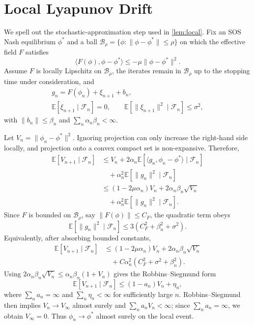 \documentclass{article}
\theoremstyle{plain}
\theoremstyle{definition}
\theoremstyle{remark}
\newcommand{\E}{\mathbb{E}}
\newcommand{\B}{\mathcal{B}}
\newcommand{\F}{\mathcal{F}}
\begin{document}
\section{Local Lyapunov Drift}\label{app:lyapunov}

We spell out the stochastic-approximation step used in \cref{lem:local}. Fix an SOS Nash equilibrium $\phi^\ast$ and a ball $\B_\rho=\{\phi:\|\phi-\phi^\ast\|\le\rho\}$ on which the effective field $F$ satisfies
\[
\langle F(\phi),\phi-\phi^\ast\rangle\le -\mu\|\phi-\phi^\ast\|^2 .
\]
Assume $F$ is locally Lipschitz on $\B_\rho$, the iterates remain in $\B_\rho$ up to the stopping time under consideration, and
\[
\begin{gathered}
g_n=F(\phi_n)+\xi_{n+1}+b_n,\\
\E[\xi_{n+1}\mid\F_n]=0,\qquad
\E[\|\xi_{n+1}\|^2\mid\F_n]\le\sigma^2,
\end{gathered}
\]
with $\|b_n\|\le\beta_n$ and $\sum_n\alpha_n\beta_n<\infty$.

Let $V_n=\|\phi_n-\phi^\ast\|^2$. Ignoring projection can only increase the right-hand side locally, and projection onto a convex compact set is non-expansive. Therefore,
\[
\begin{aligned}
\E[V_{n+1}\mid\F_n]
&\le V_n
   +2\alpha_n\E[\langle g_n,\phi_n-\phi^\ast\rangle\mid\F_n]\\
&\quad+\alpha_n^2\E[\|g_n\|^2\mid\F_n]\\
&\le (1-2\mu\alpha_n)V_n
   +2\alpha_n\beta_n\sqrt{V_n}\\
&\quad+\alpha_n^2\E[\|g_n\|^2\mid\F_n].
\end{aligned}
\]
Since $F$ is bounded on $\B_\rho$, say $\|F(\phi)\|\le C_F$, the quadratic term obeys
\[
\E[\|g_n\|^2\mid\F_n]\le
3(C_F^2+\beta_n^2+\sigma^2).
\]
Equivalently, after absorbing bounded constants,
\[
\begin{aligned}
\E[V_{n+1}\mid\F_n]
&\le (1-2\mu\alpha_n)V_n
   +2\alpha_n\beta_n\sqrt{V_n}\\
&\quad+C\alpha_n^2(C_F^2+\sigma^2+\beta_n^2).
\end{aligned}
\]
Using $2\alpha_n\beta_n\sqrt{V_n}\le \alpha_n\beta_n(1+V_n)$ gives the Robbins--Siegmund form
\[
\E[V_{n+1}\mid\F_n]\le (1-a_n)V_n+\eta_n,
\]
where $\sum_n a_n=\infty$ and $\sum_n\eta_n<\infty$ for sufficiently large $n$. Robbins--Siegmund then implies $V_n\to V_\infty$ almost surely and $\sum_n a_nV_n<\infty$; since $\sum_n a_n=\infty$, we obtain $V_\infty=0$. Thus $\phi_n\to\phi^\ast$ almost surely on the local event.
\end{document}
